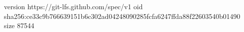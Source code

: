 version https://git-lfs.github.com/spec/v1
oid sha256:ce33c9b766639151b6c302ad04248090285fcfa6247ffda88f22603540b01490
size 87544
